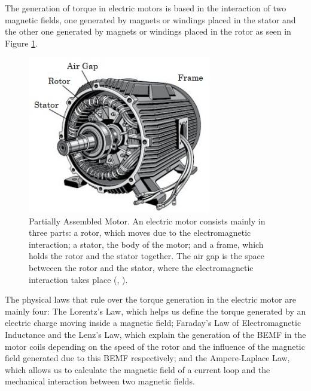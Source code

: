 The generation of torque in electric motors is based in the interaction of two magnetic fields, one generated by magnets or windings placed in the stator and the other one generated by magnets or windings placed in the rotor as seen in Figure \ref{fig:motor_assembly}.

\begin{figure}[htbp]
\centering
\includegraphics[width=8cm]{Images/motor_assembly.png} 
\caption[Partially Assembled Motor]{Partially Assembled Motor. An electric motor consists mainly in three parts: a rotor, which moves due to the electromagnetic interaction; a stator, the body of the motor; and a frame, which holds the rotor and the stator together. The air gap is the space betweeen the rotor and the stator, where the electromagnetic interaction takes place (, \citeyear{basic_components}).}
\label{fig:motor_assembly}
\end{figure}

The physical laws that rule over the torque generation in the electric motor are mainly four: The Lorentz’s Law, which helps us define the torque generated by an electric charge moving inside a magnetic field; Faraday’s Law of Electromagnetic Inductance and the Lenz’s Law, which explain the generation of the \acf{BEMF} in the motor coils depending on the speed of the rotor and the influence of the magnetic field generated due to this BEMF respectively; and the Ampere-Laplace Law, which allows us to calculate the magnetic field of a current loop and the mechanical interaction between two magnetic fields.

